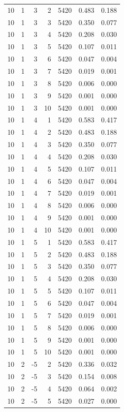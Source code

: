 \begin{table}
\begin{tabular}{rrrrrrr}
10 & 1 & 3 & 2 & 5420 & 0.483 & 0.188 \\
10 & 1 & 3 & 3 & 5420 & 0.350 & 0.077 \\
10 & 1 & 3 & 4 & 5420 & 0.208 & 0.030 \\
10 & 1 & 3 & 5 & 5420 & 0.107 & 0.011 \\
10 & 1 & 3 & 6 & 5420 & 0.047 & 0.004 \\
10 & 1 & 3 & 7 & 5420 & 0.019 & 0.001 \\
10 & 1 & 3 & 8 & 5420 & 0.006 & 0.000 \\
10 & 1 & 3 & 9 & 5420 & 0.001 & 0.000 \\
10 & 1 & 3 & 10 & 5420 & 0.001 & 0.000 \\
10 & 1 & 4 & 1 & 5420 & 0.583 & 0.417 \\
10 & 1 & 4 & 2 & 5420 & 0.483 & 0.188 \\
10 & 1 & 4 & 3 & 5420 & 0.350 & 0.077 \\
10 & 1 & 4 & 4 & 5420 & 0.208 & 0.030 \\
10 & 1 & 4 & 5 & 5420 & 0.107 & 0.011 \\
10 & 1 & 4 & 6 & 5420 & 0.047 & 0.004 \\
10 & 1 & 4 & 7 & 5420 & 0.019 & 0.001 \\
10 & 1 & 4 & 8 & 5420 & 0.006 & 0.000 \\
10 & 1 & 4 & 9 & 5420 & 0.001 & 0.000 \\
10 & 1 & 4 & 10 & 5420 & 0.001 & 0.000 \\
10 & 1 & 5 & 1 & 5420 & 0.583 & 0.417 \\
10 & 1 & 5 & 2 & 5420 & 0.483 & 0.188 \\
10 & 1 & 5 & 3 & 5420 & 0.350 & 0.077 \\
10 & 1 & 5 & 4 & 5420 & 0.208 & 0.030 \\
10 & 1 & 5 & 5 & 5420 & 0.107 & 0.011 \\
10 & 1 & 5 & 6 & 5420 & 0.047 & 0.004 \\
10 & 1 & 5 & 7 & 5420 & 0.019 & 0.001 \\
10 & 1 & 5 & 8 & 5420 & 0.006 & 0.000 \\
10 & 1 & 5 & 9 & 5420 & 0.001 & 0.000 \\
10 & 1 & 5 & 10 & 5420 & 0.001 & 0.000 \\
10 & 2 & -5 & 2 & 5420 & 0.336 & 0.032 \\
10 & 2 & -5 & 3 & 5420 & 0.154 & 0.008 \\
10 & 2 & -5 & 4 & 5420 & 0.064 & 0.002 \\
10 & 2 & -5 & 5 & 5420 & 0.027 & 0.000 \\

\end{tabular}
\end{table}
